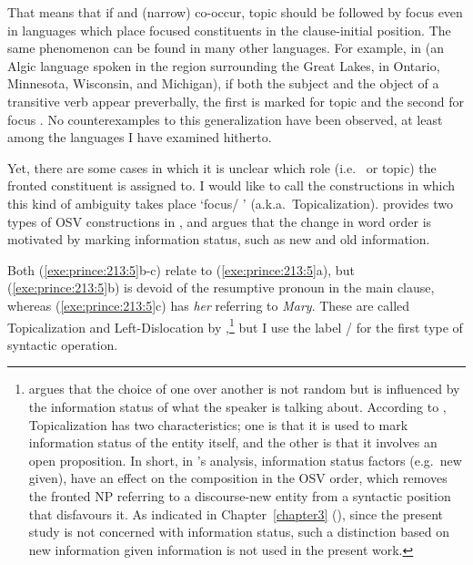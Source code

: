 \noindent That means that if  and (narrow)  co-occur, topic
should be followed by focus even in languages which place focused
constituents in the clause-initial position.
The same phenomenon can be found in many other languages.  For example, in
 (an Algic language spoken in the region surrounding the
Great Lakes, in Ontario, Minnesota, Wisconsin, and Michigan), if both
the subject and the object of a transitive verb appear preverbally,
the first is marked for topic and the second for focus
\citep{valentine:01}. No counterexamples to this generalization have
been observed, at least among the languages I have examined
hitherto.




Yet, there are some cases in which it is unclear which role
(i.e.\  or topic) the fronted constituent is assigned to.  I
would like to call the constructions in which this kind of ambiguity
takes place `focus/ ' (a.k.a.\ Topicalization).
\citet{prince:84} provides two types of OSV constructions in ,
and argues that the change in word order is motivated by marking
information status, such as new and old information.






 
\noindent Both (\ref{exe:prince:213:5}b-c) relate to
(\ref{exe:prince:213:5}a), but (\ref{exe:prince:213:5}b) is devoid of
the resumptive pronoun in the main clause, whereas
(\ref{exe:prince:213:5}c) has \textit{her} referring to
\textit{Mary}. These are called Topicalization and Left-Dislocation by
\citeauthor{prince:84},\footnote{\citet{prince:84} argues that the
  choice of one over another is not random but is influenced by the
  information status of what the speaker is talking about.  According
  to \citeauthor{prince:84}, Topicalization has two characteristics;
  one is that it is used to mark information status of the entity
  itself, and the other is that it involves an open proposition.  In
  short, in \citeauthor{prince:84}'s analysis, information status
  factors (e.g.\ new \vs given), have an effect on the composition in
  the OSV order, which removes the fronted NP referring to a
  discourse-new entity from a syntactic position 
  that disfavours it.
  As indicated in Chapter~\ref{chapter3} (), since
  the present study is not concerned with information status, such a
  distinction based on new information \vs given information is not
  used in the present work.} but I use the label / 
for the first type of syntactic operation.




